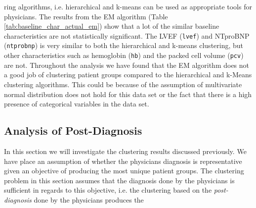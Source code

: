 \documentclass[../thesis.tex]{subfiles}
\begin{document}


\noindent ring algorithms, i.e. hierarchical and k-means can be used as appropriate tools for physicians. The results from the EM algorithm (Table \ref{tab:baseline_char_actual_em}) show that a lot of the similar baseline characteristics are not statistically significant. The LVEF (\texttt{lvef}) and NTproBNP (\texttt{ntprobnp}) is very similar to both the hierarchical and k-means clustering, but other characteristics such as hemoglobin (\texttt{hb}) and the packed cell volume (\texttt{pcv}) are not. Throughout the analysis we have found that the EM algorithm does not a good job of clustering patient groups compared to the hierarchical and k-Means clustering algorithms. This could be because of the assumption of multivariate normal distribution does not hold for this data set or the fact that there is a high presence of categorical variables in the data set.

\subsection{Analysis of Post-Diagnosis}

\noindent In this section we will investigate the clustering results discussed previously. We have place an assumption of whether the physicians diagnosis is representative given an objective of producing the most unique patient groups. The clustering problem in this section assumes that the diagnosis done by the physicians is sufficient in regards to this objective, i.e. the clustering based on the \textit{post-diagnosis} done by the physicians produces the  


\end{document}
